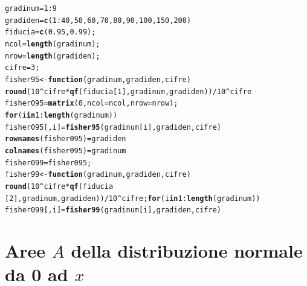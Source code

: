 \documentclass[onecolumn,12pt]{book}\usepackage[]{graphicx}\usepackage[]{color}
\makeatletter
\newcommand{\hlnum}[1]{\textcolor[rgb]{0.686,0.059,0.569}{#1}}%
\newcommand{\hlopt}[1]{\textcolor[rgb]{0,0,0}{#1}}%
\newcommand{\hlstd}[1]{\textcolor[rgb]{0.345,0.345,0.345}{#1}}%
\newcommand{\hlkwa}[1]{\textcolor[rgb]{0.161,0.373,0.58}{\textbf{#1}}}%
\newcommand{\hlkwb}[1]{\textcolor[rgb]{0.69,0.353,0.396}{#1}}%
\newcommand{\hlkwc}[1]{\textcolor[rgb]{0.333,0.667,0.333}{#1}}%
\newcommand{\hlkwd}[1]{\textcolor[rgb]{0.737,0.353,0.396}{\textbf{#1}}}%
\newenvironment{kframe}{%
 \def\at@end@of@kframe{}%
 \ifinner\ifhmode%
  \def\at@end@of@kframe{\end{minipage}}%
  \begin{minipage}{\columnwidth}%
 \fi\fi%
 \def\FrameCommand##1{\hskip\@totalleftmargin \hskip-\fboxsep
 \colorbox{shadecolor}{##1}\hskip-\fboxsep
     \hskip-\linewidth \hskip-\@totalleftmargin \hskip\columnwidth}%
 \MakeFramed {\advance\hsize-\width
   \@totalleftmargin\z@ \linewidth\hsize
   \@setminipage}}%
 {\par\unskip\endMakeFramed%
 \at@end@of@kframe}
\newenvironment{knitrout}{}{} %
\makeatother
\begin{document}
\begin{knitrout}
\color{fgcolor}\begin{kframe}
\begin{alltt}
\hlstd{gradinum}\hlkwb{=}\hlnum{1}\hlopt{:}\hlnum{9}
\hlstd{gradiden}\hlkwb{=}\hlkwd{c}\hlstd{(}\hlnum{1}\hlopt{:}\hlnum{40}\hlstd{,}\hlnum{50}\hlstd{,}\hlnum{60}\hlstd{,}\hlnum{70}\hlstd{,}\hlnum{80}\hlstd{,}\hlnum{90}\hlstd{,}\hlnum{100}\hlstd{,}\hlnum{150}\hlstd{,}\hlnum{200}\hlstd{)}
\hlstd{fiducia}\hlkwb{=}\hlkwd{c}\hlstd{(}\hlnum{0.95}\hlstd{,}\hlnum{0.99}\hlstd{);}
\hlstd{ncol}\hlkwb{=}\hlkwd{length}\hlstd{(gradinum);}
\hlstd{nrow}\hlkwb{=}\hlkwd{length}\hlstd{(gradiden);}
\hlstd{cifre}\hlkwb{=}\hlnum{3}\hlstd{;}
\hlstd{fisher95}\hlkwb{<-}\hlkwa{function}\hlstd{(}\hlkwc{gradinum}\hlstd{,}\hlkwc{gradiden}\hlstd{,}\hlkwc{cifre}\hlstd{)}
\hlkwd{round}\hlstd{(}\hlnum{10}\hlopt{^}\hlstd{cifre}\hlopt{*}\hlkwd{qf}\hlstd{(fiducia[}\hlnum{1}\hlstd{],gradinum,gradiden))}\hlopt{/}\hlnum{10}\hlopt{^}\hlstd{cifre}
\hlstd{fisher095}\hlkwb{=}\hlkwd{matrix}\hlstd{(}\hlnum{0}\hlstd{,}\hlkwc{ncol}\hlstd{=ncol,}\hlkwc{nrow}\hlstd{=nrow);}
\hlkwa{for} \hlstd{(i} \hlkwa{in} \hlnum{1}\hlopt{:}\hlkwd{length}\hlstd{(gradinum))}
\hlstd{fisher095[,i]}\hlkwb{=} \hlkwd{fisher95}\hlstd{(gradinum[i],gradiden,cifre)}
 \hlkwd{rownames}\hlstd{(fisher095)}\hlkwb{=}\hlstd{gradiden}
\hlkwd{colnames}\hlstd{(fisher095)}\hlkwb{=}\hlstd{gradinum}
\hlstd{fisher099}\hlkwb{=}\hlstd{fisher095;}
\hlstd{fisher99}\hlkwb{<-}\hlkwa{function}\hlstd{(}\hlkwc{gradinum}\hlstd{,}\hlkwc{gradiden}\hlstd{,}\hlkwc{cifre}\hlstd{)}
\hlkwd{round}\hlstd{(}\hlnum{10}\hlopt{^}\hlstd{cifre}\hlopt{*}\hlkwd{qf}\hlstd{(fiducia}
\hlstd{[}\hlnum{2}\hlstd{],gradinum,gradiden))}\hlopt{/}\hlnum{10}\hlopt{^}\hlstd{cifre;}\hlkwa{for} \hlstd{(i} \hlkwa{in} \hlnum{1}\hlopt{:}\hlkwd{length}\hlstd{(gradinum))}
\hlstd{fisher099[,i]}\hlkwb{=} \hlkwd{fisher99}\hlstd{(gradinum[i],gradiden,cifre)}
\end{alltt}
\end{kframe}
\end{knitrout}
 \setlength\textheight{9in}
\vfill\eject
\section*{Aree $A$  della distribuzione normale da 0 ad $x$}
\oddsidemargin  0.0in
\evensidemargin 0.0in
\topmargin -0.4in
\small
\end{document}
